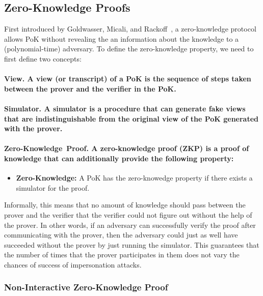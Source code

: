 \documentclass[10pt]{article}
\theoremstyle{plain}
\begin{document}
\subsection{Zero-Knowledge Proofs}

First introduced by Goldwasser, Micali, and Rackoff~\cite{Goldwasser:1985:KCI},
a zero-knowledge protocol allows PoK without revealing the an information
about the knowledge to a (polynomial-time) adversary. To define the
zero-knowledge property, we need to first define two concepts:

\paragraph{View. \textmd{A view (or transcript) of a PoK is the sequence of
		steps taken between the prover and the verifier in the PoK.}}

\paragraph{Simulator. \textmd{A simulator is a procedure that can generate fake
		views that are indistinguishable from the original view of the PoK
		generated with the prover.}}

\paragraph{Zero-Knowledge~Proof. \textmd{A zero-knowledge proof (ZKP) is a
		proof of knowledge that can additionally provide the following property:}}
\begin{itemize}
	\item \textbf{Zero-Knowledge: }A PoK has the zero-knowedge property if there
	exists a simulator for the proof.
\end{itemize}
Informally, this means that no amount of knowledge should pass between
the prover and the verifier that the verifier could not figure out
without the help of the prover. In other words, if an adversary can
successfully verify the proof after communicating with the prover,
then the adversary could just as well have succeeded without the prover
by just running the simulator. This guarantees that the number of
times that the prover participates in them does not vary the chances
of success of impersonation attacks.

\subsubsection{Non-Interactive Zero-Knowledge Proof}
\end{document}
